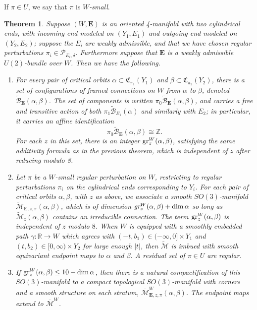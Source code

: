 \documentclass{memo-l}
\newtheorem{theorem}{Theorem}[chapter]
\theoremstyle{definition}
\theoremstyle{remark}
\numberwithin{section}{chapter}
\numberwithin{equation}{chapter}
\begin{document}
If $\pi \in U$, we say that $\pi$ is \emph{$W$-small}.

\begin{theorem}\label{CobordismPackage}Suppose $(W,\mathbf{E})$ is an oriented 4-manifold with two cylindrical ends, with incoming end modeled on $(Y_1,E_1)$ and outgoing end modeled on $(Y_2,E_2)$; suppose the $E_i$ are weakly admissible, and that we have chosen regular perturbations $\pi_i \in \mathcal P_{E_i, \delta}$. Furthermore suppose that $\mathbf{E}$ is a weakly admissible $U(2)$-bundle over $W$. Then we have the following.
\begin{enumerate}
\item For every pair of critical orbits $\alpha \subset \mathfrak C_{\pi_1}(Y_1)$ and $\beta \subset \mathfrak C_{\pi_2}(Y_2)$, there is a set of configurations of framed connections on $W$ from $\alpha$ to $\beta$, denoted $\widetilde{\mathcal B}_{\mathbf{E}}(\alpha, \beta)$. The set of components is written $\pi_0 \widetilde{\mathcal B}_{\mathbf{E}}(\alpha, \beta)$, and carries a free and transitive action of both $\pi_1 \widetilde{\mathcal B}_{E_1}(\alpha)$ and similarly with $E_2$; in particular, it carries an affine identification $$\pi_0 \widetilde{\mathcal B}_{\mathbf{E}}(\alpha, \beta) \cong \mathbb Z.$$ For each $z$ in this set, there is an integer $\textup{gr}^W_z(\alpha, \beta)$, satisfying the same additivity formula as in the previous theorem, which is independent of $z$ after reducing modulo 8. \\
\item Let $\pi$ be a $W$-small regular perturbation on $W$, restricting to regular perturbations $\pi_i$ on the cylindrical ends corresponding to $Y_i$. For each pair of critical orbits $\alpha, \beta$, with $z$ as above, we associate a smooth $SO(3)$-manifold $\widetilde{\mathcal M}_{\mathbf{E},z,\pi}(\alpha, \beta)$, which is of dimension $\text{\em{gr}}^W_z(\alpha, \beta)+\dim \alpha$ so long as $\widetilde{\mathcal M}_z(\alpha, \beta)$ contains an irreducible connection. The term $\textup{gr}^W_z(\alpha, \beta)$ is independent of $z$ modulo $8$. When $W$ is equipped with a smoothly embedded path $\gamma: \mathbb R \to W$ which agrees with $(-t,b_1) \in (-\infty, 0] \times Y_1$ and $(t, b_2) \in [0,\infty) \times Y_2$ for large enough $|t|$, then $\widetilde{\mathcal M}$ is imbued with smooth equivariant endpoint maps to $\alpha$ and $\beta$. A residual set of $\pi \in U$ are regular.\\
\item If $\textup{gr}^W_z(\alpha, \beta) \leq 10 - \dim \alpha$, then there is a natural compactification of this $SO(3)$-manifold to a compact topological $SO(3)$-manifold with corners and a smooth structure on each stratum, $\overline{\mathcal M}^W_{\mathbf{E},z,\pi}(\alpha, \beta)$. The endpoint maps extend to $\overline{\mathcal M}^W$.\\

\end{enumerate}
\end{theorem}
\end{document}
